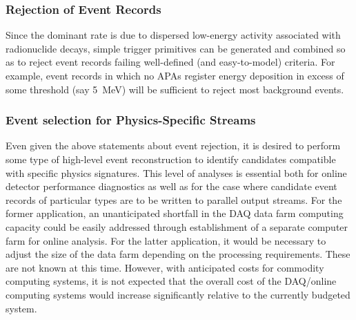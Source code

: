 \subsubsection{Rejection of Event Records}

Since the dominant rate is due to dispersed low-energy activity 
associated with radionuclide decays, simple trigger primitives can be 
generated and combined so as to reject event records failing well-defined 
(and easy-to-model) criteria.  
For example, event records in which no APAs 
register energy deposition in excess of some threshold (say 5~MeV) 
will be sufficient to reject most background events.

\subsubsection{Event selection for Physics-Specific Streams}

Even given the above statements about event rejection, it is desired to 
perform some type of high-level event reconstruction to identify candidates 
compatible with specific physics signatures.  This level of analyses is 
essential both for online detector performance diagnostics as well as 
for the case where candidate event records of particular types are to be 
written to parallel output streams.  For the former application, 
an unanticipated shortfall in the DAQ data farm computing capacity 
could be easily addressed through establishment of a separate computer farm 
for online analysis.
For the latter application, it would be necessary to adjust the size of 
the data farm depending on the processing requirements.  These are not 
known at this time.  However, with anticipated costs for commodity 
computing systems, it is not expected that the overall cost of the 
DAQ/online computing systems would increase significantly relative to 
the currently budgeted system.%


